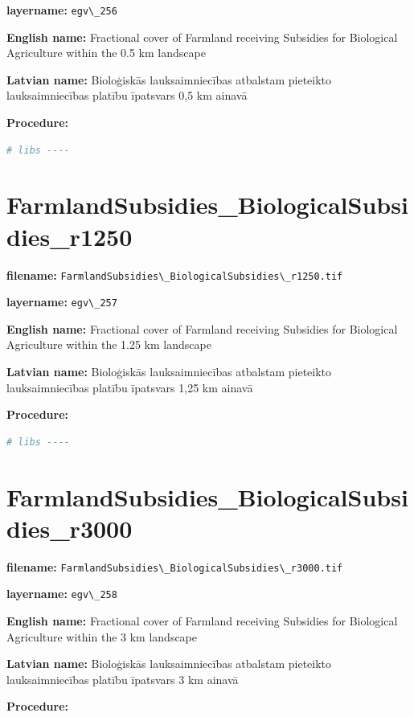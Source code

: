 \documentclass[
]{book}
\newcommand{\passthrough}[1]{#1}
\begin{document}
\textbf{layername:} \passthrough{\lstinline!egv\_256!}

\textbf{English name:} Fractional cover of Farmland receiving Subsidies for Biological Agriculture within the 0.5 km landscape

\textbf{Latvian name:} Bioloģiskās lauksaimniecības atbalstam pieteikto lauksaimniecības platību īpatsvars 0,5 km ainavā

\textbf{Procedure:}

\begin{lstlisting}[language=R]
# libs ----
\end{lstlisting}

\section{FarmlandSubsidies\_BiologicalSubsidies\_r1250}\label{ch06.257}

\textbf{filename:} \passthrough{\lstinline!FarmlandSubsidies\_BiologicalSubsidies\_r1250.tif!}

\textbf{layername:} \passthrough{\lstinline!egv\_257!}

\textbf{English name:} Fractional cover of Farmland receiving Subsidies for Biological Agriculture within the 1.25 km landscape

\textbf{Latvian name:} Bioloģiskās lauksaimniecības atbalstam pieteikto lauksaimniecības platību īpatsvars 1,25 km ainavā

\textbf{Procedure:}

\begin{lstlisting}[language=R]
# libs ----
\end{lstlisting}

\section{FarmlandSubsidies\_BiologicalSubsidies\_r3000}\label{ch06.258}

\textbf{filename:} \passthrough{\lstinline!FarmlandSubsidies\_BiologicalSubsidies\_r3000.tif!}

\textbf{layername:} \passthrough{\lstinline!egv\_258!}

\textbf{English name:} Fractional cover of Farmland receiving Subsidies for Biological Agriculture within the 3 km landscape

\textbf{Latvian name:} Bioloģiskās lauksaimniecības atbalstam pieteikto lauksaimniecības platību īpatsvars 3 km ainavā

\textbf{Procedure:}
\end{document}
